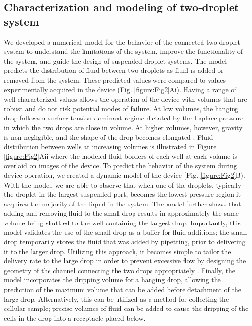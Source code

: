 \subsection{Characterization and modeling of two-droplet system}
We developed a numerical model for the behavior of the connected two droplet system to understand the limitations of the system, improve the functionality of the system, and guide the design of suspended droplet systems. The model predicts the distribution of fluid between two droplets as fluid is added or removed from the system. These predicted values were compared to values experimentally acquired in the device (Fig. \ref{figure:Fig2}Ai). Having a range of well characterized values allows the operation of the device with volumes that are robust and do not risk potential modes of failure. At low volumes, the hanging drop follows a surface-tension dominant regime dictated by the Laplace pressure \cite{Walker2002, Berthier2007} in which the two drops are close in volume. At higher volumes, however, gravity is non negligible, and the shape of the drop becomes elongated \cite{Carvajal2011}. Fluid distribution between wells at increasing volumes is illustrated in Figure \ref{figure:Fig2}Aii where the modeled fluid borders of each well at each volume is overlaid on images of the device. 
To predict the behavior of the system during device operation, we created a dynamic model of the device (Fig. \ref{figure:Fig2}B). With the model, we are able to observe that when one of the droplets, typically the droplet in the largest suspended port, becomes the lowest pressure region it acquires the majority of the liquid in the system. The model further shows that adding and removing fluid to the small drop results in approximately the same volume being shuttled to the well containing the largest drop. Importantly, this model validates the use of the small drop as a buffer for fluid additions; the small drop temporarily stores the fluid that was added by pipetting, prior to delivering it to the larger drop. Utilizing this approach, it becomes simple to tailor the delivery rate to the large drop in order to prevent excessive flow by designing the geometry of the channel connecting the two drops appropriately \cite{Berthier2011}. Finally, the model incorporates the dripping volume for a hanging drop, allowing the prediction of the maximum volume that can be added before detachment of the large drop. Alternatively, this can be utilized as a method for collecting the cellular sample; precise volumes of fluid can be added to cause the dripping of the cells in the drop into a receptacle placed below.

